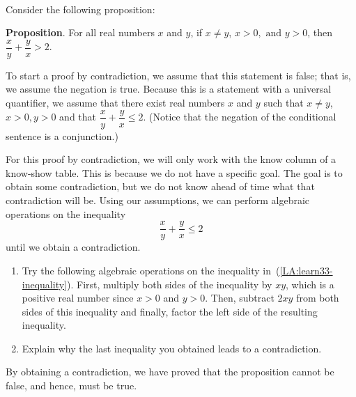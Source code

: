 \begin{previewactivity}\label{LA:contradicton2} \hfill \\
Consider the following proposition:

\newpar
\textbf{Proposition}.  For all real numbers  $x$  and  $y$, if  $x \ne y$, $x > 0,\text{ and }y > 0$, then  $\dfrac{x}{y} + \dfrac{y}{x} > 2.$

\newpar
To start a proof by contradiction, we assume that this statement is false; that is, we assume the negation is true.  Because this is a statement with a universal quantifier, we assume that there exist real numbers $x$  and  $y$  such that  $x \ne y$, $x > 0, y > 0$ and that  
$\dfrac{x}{y} + \dfrac{y}{x} \leq 2.$  (Notice that the negation of the conditional sentence is a conjunction.)

For this proof by contradiction, we will only work with the know column of a know-show table.  This is because we do not have a specific goal.  The goal is to obtain some contradiction, but we do not know ahead of time what that contradiction will be.  Using our assumptions, we can perform algebraic operations on the inequality
\begin{equation} \label{LA:learn33-inequality}
\frac{x}{y} + \frac{y}{x} \leq 2
\end{equation}
until we obtain a contradiction.  
\begin{enumerate}
  \item Try the following algebraic operations on the inequality in~(\ref{LA:learn33-inequality}).  First, multiply both sides of the inequality by $xy$, which is a positive real number since $x > 0$ and $y > 0$.  Then, subtract $2xy$ from both sides of this inequality and finally, factor the left side of the resulting inequality.
  \item Explain why the last inequality you obtained leads to a contradiction.
\end{enumerate}
By obtaining a contradiction, we have proved that the proposition cannot be false, and hence, must be true.  
\end{previewactivity}
\hbreak


\endinput
